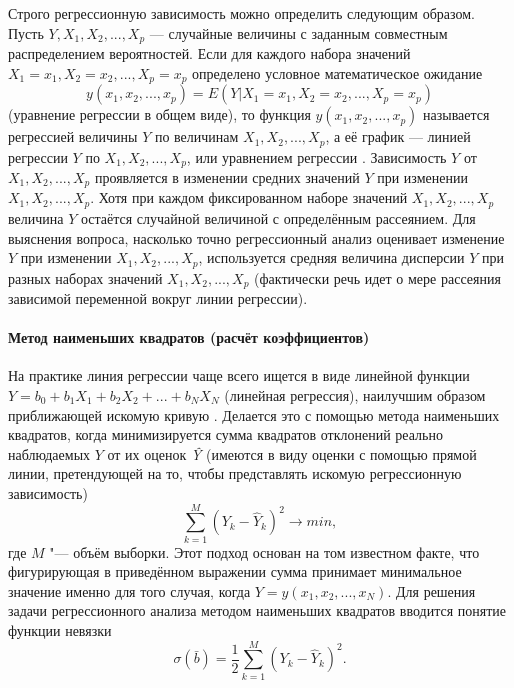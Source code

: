 Строго регрессионную зависимость можно определить следующим образом. Пусть $Y, X_1, X_2,...,X_p$  — случайные величины с заданным совместным распределением вероятностей. Если для каждого набора значений $X_1=x_1,X_2=x_2,...,X_p=x_p$ определено условное математическое ожидание
\begin{equation*}
y(x_1,x_2,...,x_p) = E(Y|X_1 = x_1, X_2 = x_2, ..., X_p = x_p)
\end{equation*}
(уравнение регрессии в общем виде), то функция $y(x_1,x_2,...,x_p)$ называется регрессией величины $Y$ по величинам $X_1,X_2,...,X_p$, а её график — линией регрессии $Y$ по $X_1,X_2,...,X_p$, или уравнением регрессии \cite{applregr}.
Зависимость $Y$ от $X_1,X_2,...,X_p$ проявляется в изменении средних значений $Y$ при изменении $X_1,X_2,...,X_p$. Хотя при каждом фиксированном наборе значений $X_1,X_2,...,X_p$ величина $Y$ остаётся случайной величиной с определённым рассеянием.
Для выяснения вопроса, насколько точно регрессионный анализ оценивает изменение $Y$ при изменении $X_1,X_2,...,X_p$, используется средняя величина дисперсии $Y$ при разных наборах значений $X_1,X_2,...,X_p$ (фактически речь идет о мере рассеяния зависимой переменной вокруг линии регрессии).

\paragraph{Метод наименьших квадратов (расчёт коэффициентов)}

На практике линия регрессии чаще всего ищется в виде линейной функции $Y = b_0 + b_1 X_1 + b_2 X_2 + ... + b_N X_N$ (линейная регрессия), наилучшим образом приближающей искомую кривую \cite{regrmeth}. Делается это с помощью метода наименьших квадратов, когда минимизируется сумма квадратов отклонений реально наблюдаемых $Y$ от их оценок \textit{\^Y} (имеются в виду оценки с помощью прямой линии, претендующей на то, чтобы представлять искомую регрессионную зависимость)
\begin{equation*}
\sum\limits_{k=1}^{M}{(Y_k - \hat{Y}_k)^2} \rightarrow min,
\end{equation*}
где $M$ "--- объём выборки. Этот подход основан на том известном факте, что фигурирующая в приведённом выражении сумма принимает минимальное значение именно для того случая, когда $Y = y(x_1,x_2,...,x_N)$.
Для решения задачи регрессионного анализа методом наименьших квадратов вводится понятие функции невязки
\begin{equation*}
\sigma(\bar{b}) = \frac{1}{2} \sum\limits_{k=1}^{M}{(Y_k - \hat{Y}_k)^2}.
\end{equation*}

